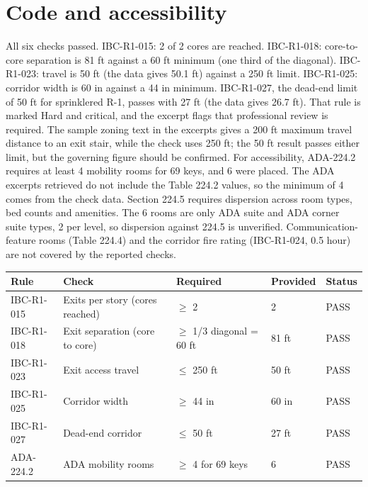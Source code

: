 \documentclass[10pt]{article}
\begin{document}
\section{Code and accessibility}
All six checks passed. IBC-R1-015: 2 of 2 cores are reached. IBC-R1-018: core-to-core separation is 81 ft against a 60 ft minimum (one third of the diagonal). IBC-R1-023: travel is 50 ft (the data gives 50.1 ft) against a 250 ft limit. IBC-R1-025: corridor width is 60 in against a 44 in minimum. IBC-R1-027, the dead-end limit of 50 ft for sprinklered R-1, passes with 27 ft (the data gives 26.7 ft). That rule is marked Hard and critical, and the excerpt flags that professional review is required. The sample zoning text in the excerpts gives a 200 ft maximum travel distance to an exit stair, while the check uses 250 ft; the 50 ft result passes either limit, but the governing figure should be confirmed. For accessibility, ADA-224.2 requires at least 4 mobility rooms for 69 keys, and 6 were placed. The ADA excerpts retrieved do not include the Table 224.2 values, so the minimum of 4 comes from the check data. Section 224.5 requires dispersion across room types, bed counts and amenities. The 6 rooms are only ADA suite and ADA corner suite types, 2 per level, so dispersion against 224.5 is unverified. Communication-feature rooms (Table 224.4) and the corridor fire rating (IBC-R1-024, 0.5 hour) are not covered by the reported checks.
{\small\begin{longtable}{p{1.9cm}p{4.3cm}p{3.6cm}p{3cm}p{1.4cm}}\toprule
\textbf{Rule} & \textbf{Check} & \textbf{Required} & \textbf{Provided} & \textbf{Status} \\ \midrule \endhead
IBC-R1-015 & Exits per story (cores reached) & $\ge$ 2 & 2 & PASS \\
IBC-R1-018 & Exit separation (core to core) & $\ge$ 1/3 diagonal = 60 ft & 81 ft & PASS \\
IBC-R1-023 & Exit access travel & $\le$ 250 ft & 50 ft & PASS \\
IBC-R1-025 & Corridor width & $\ge$ 44 in & 60 in & PASS \\
IBC-R1-027 & Dead-end corridor & $\le$ 50 ft & 27 ft & PASS \\
ADA-224.2 & ADA mobility rooms & $\ge$ 4 for 69 keys & 6 & PASS \\
\bottomrule\end{longtable}}
\end{document}
